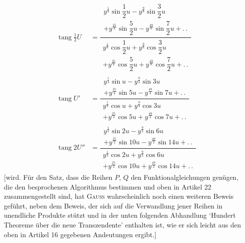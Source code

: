 \[
\begin{aligned}
\operatorname{tang}\tfrac12 U
 &=\dfrac{\begin{gathered}y^{\frac18}\sin\dfrac12u-y^{\frac98}\sin\dfrac32u\\[3pt]+y^{\frac{25}8}\sin\dfrac52u-y^{\frac{49}8}\sin\dfrac72u+\mathord{.}\,\mathord{.}\end{gathered}}{\begin{gathered}y^{\frac18}\cos\dfrac12u+y^{\frac98}\cos\dfrac32u\\[3pt]+y^{\frac{25}8}\cos\dfrac52u+y^{\frac{49}8}\cos\dfrac72u+\mathord{.}\,\mathord{.}\end{gathered}}\\[14pt]
\operatorname{tang} U'
 &=\dfrac{\begin{gathered}y^{\frac14}\sin u-y^{\frac94}\sin3u\\[3pt]+y^{\frac{25}4}\sin5u-y^{\frac{49}4}\sin7u+\mathord{.}\,\mathord{.}\end{gathered}}{\begin{gathered}y^{\frac14}\cos u+y^{\frac94}\cos3u\\[3pt]+y^{\frac{25}4}\cos5u+y^{\frac{49}4}\cos7u+\mathord{.}\,\mathord{.}\end{gathered}}\\[14pt]
\operatorname{tang}2U''
 &=\dfrac{\begin{gathered}y^{\frac12}\sin2u-y^{\frac92}\sin6u\\[3pt]+y^{\frac{25}2}\sin10u-y^{\frac{49}2}\sin14u+\mathord{.}\,\mathord{.}\end{gathered}}{\begin{gathered}y^{\frac12}\cos2u+y^{\frac92}\cos6u\\[3pt]+y^{\frac{25}2}\cos10u+y^{\frac{49}2}\cos14u+\mathord{.}\,\mathord{.}\end{gathered}}
\end{aligned}
\]
[wird. Für den Satz, dass die Reihen $P$, $Q$ den Funktionalgleichungen genügen, die den besprochenen Algorithmus bestimmen und oben in Artikel 22 zusammengestellt sind, hat \textsc{Gauss} wahrscheinlich noch einen weiteren Beweis geführt, neben dem Beweis, der sich auf die Verwandlung jener Reihen in unendliche Produkte stützt und in der unten folgenden Abhandlung ‘Hundert Theoreme über die neue Transzendente’ enthalten ist, wie er sich leicht aus den oben in Artikel 16 gegebenen Andeutungen ergibt.]

